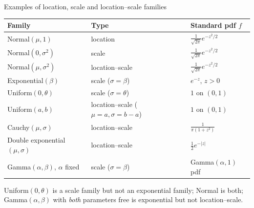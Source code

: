 \documentclass[aspectratio=169,t,10pt]{beamer}
\begin{document}
\begin{frame}{Examples of location, scale and location--scale families}
  \small
  \renewcommand{\arraystretch}{1.15}
  \begin{center}
  \begin{tabular}{@{}lll@{}}
  \textbf{Family}&\textbf{Type}&\textbf{Standard pdf $f$}\\\hline
  Normal$(\mu,1)$&location&$\frac1{\sqrt{2\pi}}e^{-z^2/2}$\\
  Normal$(0,\sigma^2)$&scale&$\frac1{\sqrt{2\pi}}e^{-z^2/2}$\\
  Normal$(\mu,\sigma^2)$&location--scale&$\frac1{\sqrt{2\pi}}e^{-z^2/2}$\\
  Exponential$(\beta)$&scale ($\sigma=\beta$)&$e^{-z}$, $z>0$\\
  Uniform$(0,\theta)$&scale ($\sigma=\theta$)&$1$ on $(0,1)$\\
  Uniform$(a,b)$&location--scale ($\mu=a,\sigma=b-a$)&$1$ on $(0,1)$\\
  Cauchy$(\mu,\sigma)$&location--scale&$\frac1{\pi(1+z^2)}$\\
  Double exponential$(\mu,\sigma)$&location--scale&$\frac12e^{-|z|}$\\
  Gamma$(\alpha,\beta)$, $\alpha$ fixed&scale ($\sigma=\beta$)&Gamma$(\alpha,1)$ pdf
  \end{tabular}
  \end{center}
  \begin{tcolorbox}[mynote={Caution}]\footnotesize
  Uniform$(0,\theta)$ is a scale family but not an exponential family; Normal is both; Gamma$(\alpha,\beta)$ with \emph{both} parameters free is exponential but not location--scale.
  \end{tcolorbox}
\end{frame}
\end{document}
